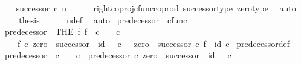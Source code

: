 \begin{isabellebody}
\ \isamarkupfalse%
\ {\isachardoublequoteopen}{\isachardot}{\kern0pt}{\isachardot}{\kern0pt}{\isachardot}{\kern0pt}\ {\isacharequal}{\kern0pt}\ successor\ {\isasymcirc}\isactrlsub c\ n{\isachardoublequoteclose}\isanewline
\ \ \ \ \isamarkupfalse%
\ right{\isacharunderscore}{\kern0pt}coproj{\isacharunderscore}{\kern0pt}cfunc{\isacharunderscore}{\kern0pt}coprod\ successor{\isacharunderscore}{\kern0pt}type\ zero{\isacharunderscore}{\kern0pt}type\ \isamarkupfalse%
\ auto\isanewline
\ \ \isamarkupfalse%
\ \isamarkupfalse%
\ {\isacharquery}{\kern0pt}thesis\isanewline
\ \ \ \ \isamarkupfalse%
\ n{\isacharunderscore}{\kern0pt}def\ \isamarkupfalse%
\ auto\isanewline
{}\isamarkupfalse%
%
\endisatagproof
{\isafoldproof}%
%
\isadelimproof
%
\endisadelimproof
%
\isadelimdocument
%
\endisadelimdocument
%
\isatagdocument
%
\isamarkuptrue%
%
\endisatagdocument
{\isafolddocument}%
%
\isadelimdocument
%
\endisadelimdocument
{}\isamarkupfalse%
\ predecessor{\isacharprime}{\kern0pt}\ {\isacharcolon}{\kern0pt}{\isacharcolon}{\kern0pt}\ {\isachardoublequoteopen}cfunc{\isachardoublequoteclose}\ \isanewline
\ \ {\isachardoublequoteopen}predecessor{\isacharprime}{\kern0pt}\ {\isacharequal}{\kern0pt}\ {\isacharparenleft}{\kern0pt}THE\ f{\isachardot}{\kern0pt}\ f\ {\isacharcolon}{\kern0pt}\ {\isasymnat}\isactrlsub c\ {\isasymrightarrow}\ {\isasymone}\ {\isasymCoprod}\ {\isasymnat}\isactrlsub c\ \isanewline
\ \ \ \ {\isasymand}\ f\ {\isasymcirc}\isactrlsub c\ {\isacharparenleft}{\kern0pt}zero\ {\isasymamalg}\ successor{\isacharparenright}{\kern0pt}\ {\isacharequal}{\kern0pt}\ id\ {\isacharparenleft}{\kern0pt}{\isasymone}\ {\isasymCoprod}\ {\isasymnat}\isactrlsub c{\isacharparenright}{\kern0pt}\ {\isasymand}\ \ {\isacharparenleft}{\kern0pt}zero\ {\isasymamalg}\ successor{\isacharparenright}{\kern0pt}\ {\isasymcirc}\isactrlsub c\ f\ {\isacharequal}{\kern0pt}\ id\ {\isasymnat}\isactrlsub c{\isacharparenright}{\kern0pt}{\isachardoublequoteclose}\isanewline
\isanewline
{}\isamarkupfalse%
\ predecessor{\isacharprime}{\kern0pt}{\isacharunderscore}{\kern0pt}def{}{\isacharcolon}{\kern0pt}\isanewline
\ \ {\isachardoublequoteopen}predecessor{\isacharprime}{\kern0pt}\ {\isacharcolon}{\kern0pt}\ {\isasymnat}\isactrlsub c\ {\isasymrightarrow}\ {\isasymone}\ {\isasymCoprod}\ {\isasymnat}\isactrlsub c\ {\isasymand}\ predecessor{\isacharprime}{\kern0pt}\ {\isasymcirc}\isactrlsub c\ {\isacharparenleft}{\kern0pt}zero\ {\isasymamalg}\ successor{\isacharparenright}{\kern0pt}\ {\isacharequal}{\kern0pt}\ id\ {\isacharparenleft}{\kern0pt}{\isasymone}\ {\isasymCoprod}\ {\isasymnat}\isactrlsub c{\isacharparenright}{\kern0pt}\isanewline

\end{isabellebody}
